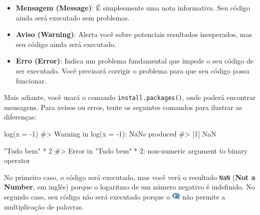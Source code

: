 \documentclass[
  letterpaper,
]{book}
\newenvironment{Shaded}{\begin{snugshade}}{\end{snugshade}}
\newcommand{\AttributeTok}[1]{\textcolor[rgb]{0.40,0.45,0.13}{#1}}
\newcommand{\CommentTok}[1]{\textcolor[rgb]{0.37,0.37,0.37}{#1}}
\newcommand{\DecValTok}[1]{\textcolor[rgb]{0.68,0.00,0.00}{#1}}
\newcommand{\FunctionTok}[1]{\textcolor[rgb]{0.28,0.35,0.67}{#1}}
\newcommand{\NormalTok}[1]{\textcolor[rgb]{0.00,0.23,0.31}{#1}}
\newcommand{\SpecialCharTok}[1]{\textcolor[rgb]{0.37,0.37,0.37}{#1}}
\newcommand{\StringTok}[1]{\textcolor[rgb]{0.13,0.47,0.30}{#1}}
\theoremstyle{definition}
\theoremstyle{plain}
\theoremstyle{remark}
\begin{document}
\begin{itemize}
\item
  \textbf{Mensagem (Message)}: É simplesmente uma nota informativa. Seu
  código ainda será executado sem problemas.
\item
  \textbf{Aviso (Warning)}: Alerta você sobre potenciais resultados
  inesperados, mas seu código ainda será executado.
\item
  \textbf{Erro (Error)}: Indica um problema fundamental que impede o seu
  código de ser executado. Você precisará corrigir o problema para que
  seu código possa funcionar.
\end{itemize}

Mais adiante, você usará o comando \texttt{install.packages()}, onde
poderá encontrar mensagens. Para avisos ou erros, tente os seguintes
comandos para ilustrar as diferenças:

\begin{Shaded}
\begin{Highlighting}[]
\FunctionTok{log}\NormalTok{(}\AttributeTok{x =} \SpecialCharTok{{-}}\DecValTok{1}\NormalTok{)}
\CommentTok{\#\textgreater{} Warning in log(x = {-}1): NaNs produced}
\CommentTok{\#\textgreater{} [1] NaN}
\end{Highlighting}
\end{Shaded}

\begin{Shaded}
\begin{Highlighting}[]
\StringTok{"Tudo bem"} \SpecialCharTok{*} \DecValTok{2}
\CommentTok{\#\textgreater{} Error in "Tudo bem" * 2: non{-}numeric argument to binary operator}
\end{Highlighting}
\end{Shaded}

No primeiro caso, o código será executado, mas você verá o resultado
\texttt{NaN} (\textbf{Not a Number}, em inglês) porque o logaritmo de um
número negativo é indefinido. No segundo caso, seu código não será
executado porque o
\includegraphics[width=1.13em,height=1em]{getting_started_with_r_files/figure-pdf/fa-icon-9b00320707d42527dde67262afb33ded.pdf}
não permite a multiplicação de palavras.
\end{document}
